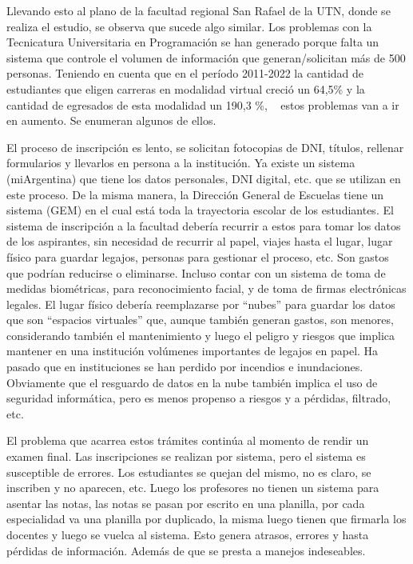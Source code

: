 \documentclass[a4paper]{article}
\begin{document}
Llevando esto al plano de la facultad regional San Rafael de la UTN, donde se realiza el estudio, se observa que sucede algo similar. Los problemas con la Tecnicatura Universitaria en Programación se han generado porque falta un sistema que controle el volumen de información que generan/solicitan más de 500 personas. Teniendo en cuenta que en el período 2011-2022 la cantidad de estudiantes que eligen carreras en modalidad virtual creció un 64,5\% y la cantidad de egresados de esta modalidad un 190,3 \%, ~\cite{blearning} estos problemas van a ir en aumento. Se enumeran algunos de ellos.

El proceso de inscripción es lento, se solicitan fotocopias de DNI, títulos, rellenar formularios y llevarlos en persona a la institución. Ya existe un sistema (miArgentina) que tiene los datos personales, DNI digital, etc. que se utilizan en este proceso. De la misma manera, la Dirección General de Escuelas tiene un sistema (GEM) en el cual está toda la trayectoria escolar de los estudiantes.  El sistema de inscripción a la facultad debería recurrir a estos para tomar los datos de los aspirantes, sin necesidad de recurrir al papel, viajes hasta el lugar, lugar físico para guardar legajos, personas para gestionar el proceso, etc. Son gastos que podrían reducirse o eliminarse. Incluso contar con un sistema de toma de medidas biométricas, para reconocimiento facial, y de toma de firmas electrónicas legales. El lugar físico debería reemplazarse por “nubes” para guardar los datos que son “espacios virtuales” que, aunque también generan gastos, son menores, considerando también el mantenimiento y luego el peligro y riesgos que implica mantener en una institución volúmenes importantes de legajos en papel. Ha pasado que en instituciones se han perdido por incendios e inundaciones. Obviamente que el resguardo de datos en la nube también implica el uso de seguridad informática, pero es menos propenso a riesgos y a pérdidas, filtrado, etc. 

El problema que acarrea estos trámites continúa al momento de rendir un examen final. Las inscripciones se realizan por sistema, pero el sistema es susceptible de errores. Los estudiantes se quejan del mismo, no es claro, se inscriben y no aparecen, etc. Luego los profesores no tienen un sistema para asentar las notas, las notas se pasan por escrito en una planilla, por cada especialidad va una planilla por duplicado, la misma luego tienen que firmarla los docentes y luego se vuelca al sistema. Esto genera atrasos, errores y hasta pérdidas de información. Además de que se presta a manejos indeseables.  
\end{document}
